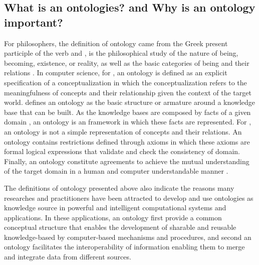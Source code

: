 \subsection{What is an ontologies? and Why is an ontology important?}
\label{subsec:ontologies}

For philosophers, the definition of ontology came from the Greek  present participle of the verb  and , is the philosophical study of the nature of being, becoming, existence, or reality, as well as the basic categories of being and their relations \cite{Wikipedia2014}. In computer science, for , an ontology is defined as an explicit specification of a conceptualization in which the conceptualization refers to the meaningfulness of concepts and their relationship given the context of the target world.  defines an ontology as the basic structure or armature around a knowledge base that can be built. As the knowledge bases are composed by facts of a given domain \cite{Hayes-RothWatermanLenat1983}, an ontology is an framework in which these facts are represented. For \cite{GuarinoOberleStaab2009}, an ontology is not a simple representation of concepts and their relations. An ontology contains restrictions defined through axioms in which these axioms are formal logical expressions that validate and check the consistency of domain. Finally, an ontology constitute agreements to achieve the mutual understanding of the target domain in a human and computer understandable manner \cite{Mizoguchi2004a}.

The definitions of ontology presented above also indicate the reasons  many researches and practitioners have been attracted to develop and use ontologies as knowledge source in powerful and intelligent computational systems and applications. In these applications, an ontology first provide a common conceptual structure that enables the development of sharable and reusable knowledge-based by computer-based mechanisms and procedures, and second an ontology facilitates the interoperability of information enabling them to merge and integrate data from different sources.

